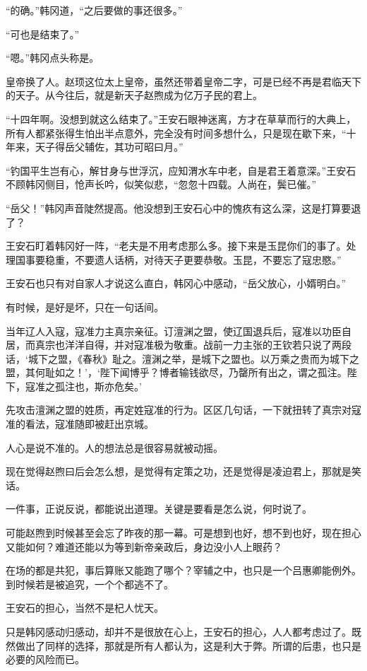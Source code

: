 “的确。”韩冈道，“之后要做的事还很多。”

“可也是结束了。”

“嗯。”韩冈点头称是。

皇帝换了人。赵顼这位太上皇帝，虽然还带着皇帝二字，可是已经不再是君临天下的天子。从今往后，就是新天子赵煦成为亿万子民的君上。

“十四年啊。没想到就这么结束了。”王安石眼神迷离，方才在草草而行的大典上，所有人都紧张得生怕出半点意外，完全没有时间多想什么，只是现在歇下来，“十年来，天子得岳父辅佐，其功可昭曰月。”

“钓国平生岂有心，解甘身与世浮沉，应知渭水车中老，自是君王着意深。”王安石不顾韩冈侧目，怆声长吟，似笑似悲，“忽忽十四载。人尚在，鬓已催。”

“岳父！”韩冈声音陡然提高。他没想到王安石心中的愧疚有这么深，这是打算要退了？

王安石盯着韩冈好一阵，“老夫是不用考虑那么多。接下来是玉昆你们的事了。处理国事要稳重，不要遗人话柄，对待天子更要恭敬。玉昆，不要忘了寇忠愍。”

王安石也只有对自家人才说这么直白，韩冈心中感动，“岳父放心，小婿明白。”

有时候，是好是坏，只在一句话间。

当年辽人入寇，寇准力主真宗亲征。订澶渊之盟，使辽国退兵后，寇准以功臣自居，而真宗也洋洋自得，并对寇准极为敬重。战前一力主张的王钦若只说了两段话，‘城下之盟，《春秋》耻之。澶渊之举，是城下之盟也。以万乘之贵而为城下之盟，其何耻如之！’，‘陛下闻博乎？博者输钱欲尽，乃罄所有出之，谓之孤注。陛下，寇准之孤注也，斯亦危矣。’

先攻击澶渊之盟的姓质，再定姓寇准的行为。区区几句话，一下就扭转了真宗对寇准的看法，寇准随即被赶出京城。

人心是说不准的。人的想法总是很容易就被动摇。

现在觉得赵煦曰后会怎么想，是觉得有定策之功，还是觉得是凌迫君上，那就是笑话。

一件事，正说反说，都能说出道理。关键是要看是怎么说，何时说了。

可能赵煦到时候甚至会忘了昨夜的那一幕。可是想到也好，想不到也好，现在担心又能如何？难道还能以为等到新帝亲政后，身边没小人上眼药？

在场的都是共犯，事后算账又能跑了哪个？宰辅之中，也只是一个吕惠卿能例外。到时候若是被追究，一个个都逃不了。

王安石的担心，当然不是杞人忧天。

只是韩冈感动归感动，却并不是很放在心上，王安石的担心，人人都考虑过了。既然做出了同样的选择，那就是所有人都认为，这是利大于弊。所谓的后患，也只是必要的风险而已。

